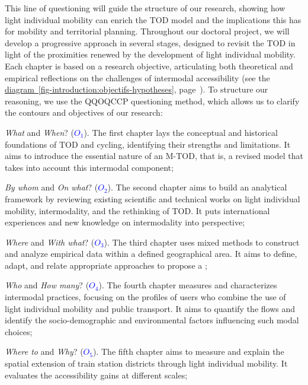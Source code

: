 \begin{refsegment}
This line of questioning will guide the structure of our research, showing how light individual mobility can enrich the \acrshort{TOD} model and the implications this has for mobility and territorial planning. Throughout our doctoral project, we will develop a progressive approach in several stages, designed to revisit the \acrshort{TOD} in light of the proximities renewed by the development of light individual mobility. Each chapter is based on a research objective, articulating both theoretical and empirical reflections on the challenges of intermodal accessibility (see the \hyperref[fig-introduction:objectifs-hypotheses]{diagram~\ref{fig-introduction:objectifs-hypotheses}}, page~\pageref{fig-introduction:objectifs-hypotheses}). To structure our reasoning, we use the \acrfull{QQOQCCP} questioning method, which allows us to clarify the contours and objectives of our research:
        \begin{customitemize}
    \item \textsl{What} and \textsl{When}? ({\textcolor{blue}{\(O_1\)}\label{objectif-1}}). The first chapter lays the conceptual and historical foundations of \acrshort{TOD} and cycling, identifying their strengths and limitations. It aims to introduce the essential nature of an \acrshort{M-TOD}, that is, a revised model that takes into account this intermodal component;
    \item \textsl{By whom} and \textsl{On what}? ({\textcolor{blue}{\(O_2\)}\label{objectif-2}}). The second chapter aims to build an analytical framework by reviewing existing scientific and technical works on light individual mobility, \gls{intermodality}, and the rethinking of \acrshort{TOD}. It puts international experiences and new knowledge on intermodality into perspective;
    \item \textsl{Where} and \textsl{With what}? ({\textcolor{blue}{\(O_3\)}\label{objectif-3}}). The third chapter uses mixed methods to construct and analyze empirical data within a defined geographical area. It aims to define, adapt, and relate appropriate approaches to propose a ;
    \item \textsl{Who} and \textsl{How many}? ({\textcolor{blue}{\(O_4\)}\label{objectif-4}}). The fourth chapter measures and characterizes intermodal practices, focusing on the profiles of users who combine the use of light individual mobility and public transport. It aims to quantify the flows and identify the socio-demographic and environmental factors influencing such modal choices;
    \item \textsl{Where to} and \textsl{Why}? ({\textcolor{blue}{\(O_5\)}\label{objectif-5}}). The fifth chapter aims to measure and explain the spatial extension of train station districts through light individual mobility. It evaluates the accessibility gains at different scales;

\end{customitemize}
\end{refsegment}
